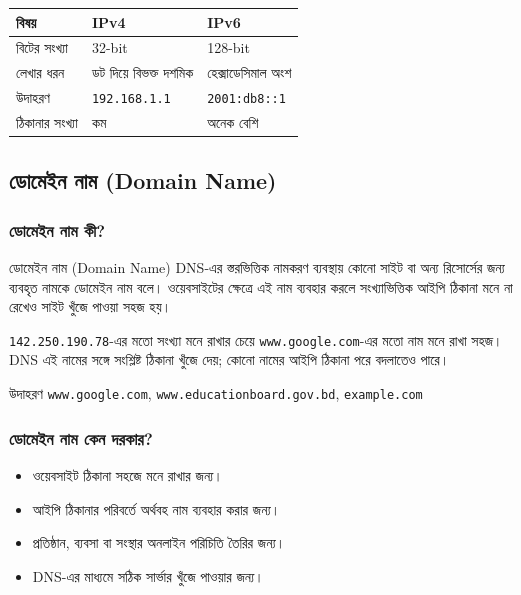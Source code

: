 \begin{center}
\begin{tabular}{|p{}|p{}|p{}|}
\hline
\textbf{বিষয়} & \textbf{IPv4} & \textbf{IPv6} \\
\hline
বিটের সংখ্যা & 32-bit & 128-bit \\
\hline
লেখার ধরন & ডট দিয়ে বিভক্ত দশমিক & হেক্সাডেসিমাল অংশ \\
\hline
উদাহরণ & \texttt{192.168.1.1} & \texttt{2001:db8::1} \\
\hline
ঠিকানার সংখ্যা & কম & অনেক বেশি \\
\hline
\end{tabular}
\end{center}

\subsection{ডোমেইন নাম (Domain Name)}

\subsubsection{ডোমেইন নাম কী?}

\begin{definitionbox}{ডোমেইন নাম (Domain Name)}
DNS-এর স্তরভিত্তিক নামকরণ ব্যবস্থায় কোনো সাইট বা অন্য রিসোর্সের জন্য ব্যবহৃত নামকে ডোমেইন নাম বলে। ওয়েবসাইটের ক্ষেত্রে এই নাম ব্যবহার করলে সংখ্যাভিত্তিক আইপি ঠিকানা মনে না রেখেও সাইট খুঁজে পাওয়া সহজ হয়।
\end{definitionbox}

\texttt{142.250.190.78}-এর মতো সংখ্যা মনে রাখার চেয়ে \texttt{www.google.com}-এর মতো নাম মনে রাখা সহজ। DNS এই নামের সঙ্গে সংশ্লিষ্ট ঠিকানা খুঁজে দেয়; কোনো নামের আইপি ঠিকানা পরে বদলাতেও পারে।

\begin{examplebox}{উদাহরণ}
\texttt{www.google.com}, \texttt{www.educationboard.gov.bd}, \texttt{example.com}
\end{examplebox}

\subsubsection{ডোমেইন নাম কেন দরকার?}

\begin{itemize}
\item ওয়েবসাইট ঠিকানা সহজে মনে রাখার জন্য।
\item আইপি ঠিকানার পরিবর্তে অর্থবহ নাম ব্যবহার করার জন্য।
\item প্রতিষ্ঠান, ব্যবসা বা সংস্থার অনলাইন পরিচিতি তৈরির জন্য।
\item DNS-এর মাধ্যমে সঠিক সার্ভার খুঁজে পাওয়ার জন্য।
\end{itemize}

